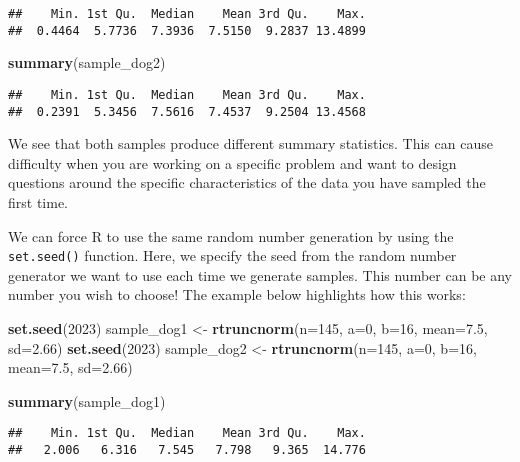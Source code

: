 \documentclass[
]{book}
\newenvironment{Shaded}{\begin{snugshade}}{\end{snugshade}}
\newcommand{\DataTypeTok}[1]{\textcolor[rgb]{0.13,0.29,0.53}{#1}}
\newcommand{\DecValTok}[1]{\textcolor[rgb]{0.00,0.00,0.81}{#1}}
\newcommand{\FloatTok}[1]{\textcolor[rgb]{0.00,0.00,0.81}{#1}}
\newcommand{\KeywordTok}[1]{\textcolor[rgb]{0.13,0.29,0.53}{\textbf{#1}}}
\newcommand{\NormalTok}[1]{#1}
\newcommand{\StringTok}[1]{\textcolor[rgb]{0.31,0.60,0.02}{#1}}
\begin{document}
\begin{verbatim}
##    Min. 1st Qu.  Median    Mean 3rd Qu.    Max. 
##  0.4464  5.7736  7.3936  7.5150  9.2837 13.4899
\end{verbatim}

\begin{Shaded}
\begin{Highlighting}[]
\KeywordTok{summary}\NormalTok{(sample_dog2)}
\end{Highlighting}
\end{Shaded}

\begin{verbatim}
##    Min. 1st Qu.  Median    Mean 3rd Qu.    Max. 
##  0.2391  5.3456  7.5616  7.4537  9.2504 13.4568
\end{verbatim}

We see that both samples produce different summary statistics. This can cause difficulty when you are working on a specific problem and want to design questions around the specific characteristics of the data you have sampled the first time.

We can force R to use the same random number generation by using the \texttt{set.seed()} function. Here, we specify the seed from the random number generator we want to use each time we generate samples. This number can be any number you wish to choose! The example below highlights how this works:

\begin{Shaded}
\begin{Highlighting}[]
\KeywordTok{set.seed}\NormalTok{(}\DecValTok{2023}\NormalTok{)}
\NormalTok{sample_dog1 <-}\StringTok{ }\KeywordTok{rtruncnorm}\NormalTok{(}\DataTypeTok{n=}\DecValTok{145}\NormalTok{, }\DataTypeTok{a=}\DecValTok{0}\NormalTok{, }\DataTypeTok{b=}\DecValTok{16}\NormalTok{, }\DataTypeTok{mean=}\FloatTok{7.5}\NormalTok{, }\DataTypeTok{sd=}\FloatTok{2.66}\NormalTok{)}
\KeywordTok{set.seed}\NormalTok{(}\DecValTok{2023}\NormalTok{)}
\NormalTok{sample_dog2 <-}\StringTok{ }\KeywordTok{rtruncnorm}\NormalTok{(}\DataTypeTok{n=}\DecValTok{145}\NormalTok{, }\DataTypeTok{a=}\DecValTok{0}\NormalTok{, }\DataTypeTok{b=}\DecValTok{16}\NormalTok{, }\DataTypeTok{mean=}\FloatTok{7.5}\NormalTok{, }\DataTypeTok{sd=}\FloatTok{2.66}\NormalTok{)}

\KeywordTok{summary}\NormalTok{(sample_dog1)}
\end{Highlighting}
\end{Shaded}

\begin{verbatim}
##    Min. 1st Qu.  Median    Mean 3rd Qu.    Max. 
##   2.006   6.316   7.545   7.798   9.365  14.776
\end{verbatim}
\end{document}
